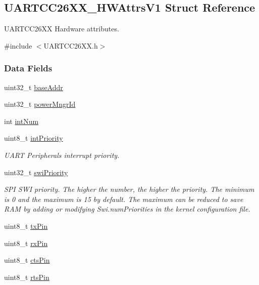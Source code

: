 \subsection{U\+A\+R\+T\+C\+C26\+X\+X\+\_\+\+H\+W\+Attrs\+V1 Struct Reference}
\label{struct_u_a_r_t_c_c26_x_x___h_w_attrs_v1}


U\+A\+R\+T\+C\+C26\+X\+X Hardware attributes.  




{\ttfamily \#include $<$U\+A\+R\+T\+C\+C26\+X\+X.\+h$>$}

\subsubsection*{Data Fields}
\begin{DoxyCompactItemize}
\item 
uint32\+\_\+t \hyperlink{struct_u_a_r_t_c_c26_x_x___h_w_attrs_v1_ab3c60d51dd982103c8164e5c4e061cbb}{base\+Addr}
\item 
uint32\+\_\+t \hyperlink{struct_u_a_r_t_c_c26_x_x___h_w_attrs_v1_af30b5ffcc6c2a4ba3e0ea7f5d63ce727}{power\+Mngr\+Id}
\item 
int \hyperlink{struct_u_a_r_t_c_c26_x_x___h_w_attrs_v1_a59744c858c663c05b6f267c52dcec7f5}{int\+Num}
\item 
uint8\+\_\+t \hyperlink{struct_u_a_r_t_c_c26_x_x___h_w_attrs_v1_a2c260eeef17e44e61771a7b41a06f384}{int\+Priority}
\begin{DoxyCompactList}\small\item\em U\+A\+R\+T Peripheral\textquotesingle{}s interrupt priority. \end{DoxyCompactList}\item 
uint32\+\_\+t \hyperlink{struct_u_a_r_t_c_c26_x_x___h_w_attrs_v1_afc7bc36e36a8ba28553cc8c9c273c2a5}{swi\+Priority}
\begin{DoxyCompactList}\small\item\em S\+P\+I S\+W\+I priority. The higher the number, the higher the priority. The minimum is 0 and the maximum is 15 by default. The maximum can be reduced to save R\+A\+M by adding or modifying Swi.\+num\+Priorities in the kernel configuration file. \end{DoxyCompactList}\item 
uint8\+\_\+t \hyperlink{struct_u_a_r_t_c_c26_x_x___h_w_attrs_v1_a54f587d72de124eee36082a0a196d5b1}{tx\+Pin}
\item 
uint8\+\_\+t \hyperlink{struct_u_a_r_t_c_c26_x_x___h_w_attrs_v1_af6cae05291cdffa89d831fab2d863262}{rx\+Pin}
\item 
uint8\+\_\+t \hyperlink{struct_u_a_r_t_c_c26_x_x___h_w_attrs_v1_a7c613f6fb7ca89f029fc64976af0b9a1}{cts\+Pin}
\item 
uint8\+\_\+t \hyperlink{struct_u_a_r_t_c_c26_x_x___h_w_attrs_v1_ace483e629545c13ad5edf711f566be7e}{rts\+Pin}
\end{DoxyCompactItemize}


